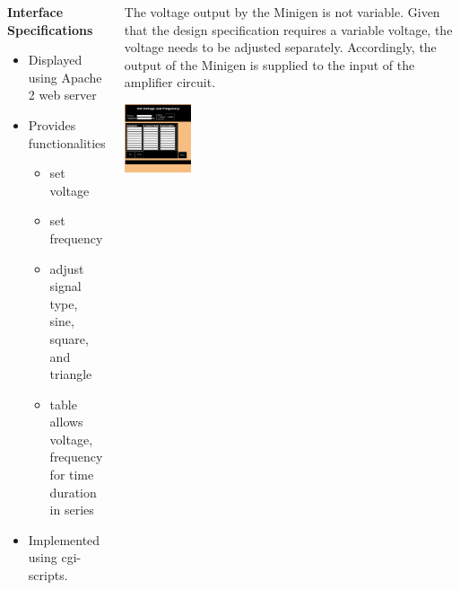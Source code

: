 \documentclass[25pt, a0paper, portrait, margin=0mm, innermargin=15mm, blockverticalspace=15mm, colspace=15mm, subcolspace=8mm]{tikzposter}
\begin{document}
\begin{columns}
{\begin{multicols}{2}
\textbf{Interface Specifications}
\begin{itemize}
\item Displayed using Apache 2 web server 
\item Provides functionalities
\begin{itemize}
\item set voltage
\item set frequency
\item adjust signal type, sine, square, and triangle
\item table allows voltage, frequency for time duration in series
\end{itemize}
\item Implemented using cgi-scripts.
\end{itemize}



\end{multicols}
}

{
\begin{multicols}{2}
The voltage output by the Minigen is not variable.
Given that the design specification requires a variable voltage,
the voltage needs to be adjusted separately.
Accordingly, the output of the Minigen 
is supplied to the input of the amplifier circuit.

\begin{center}
\includegraphics[width=0.2\textwidth,keepaspectratio]{491_web_interface_good.png}
\end{center}


\end{multicols}}
\end{columns}
\end{document}
